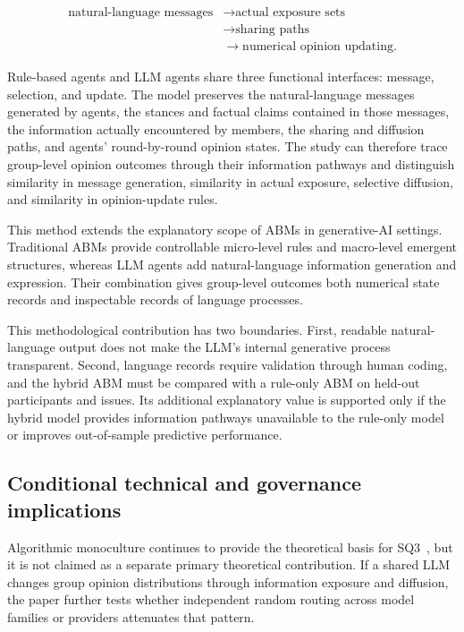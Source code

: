 \documentclass[11pt,a4paper]{article}
\begin{document}
\begin{equation*}
\begin{aligned}\text{natural-language messages} &\rightarrow \text{actual exposure sets} \\
&\rightarrow \text{sharing paths} \\
&\rightarrow \text{numerical opinion updating}.\end{aligned}
\end{equation*}

Rule-based agents and LLM agents share three functional interfaces: message, selection, and update. The model preserves the natural-language messages generated by agents, the stances and factual claims contained in those messages, the information actually encountered by members, the sharing and diffusion paths, and agents' round-by-round opinion states. The study can therefore trace group-level opinion outcomes through their information pathways and distinguish similarity in message generation, similarity in actual exposure, selective diffusion, and similarity in opinion-update rules.

This method extends the explanatory scope of ABMs in generative-AI settings. Traditional ABMs provide controllable micro-level rules and macro-level emergent structures, whereas LLM agents add natural-language information generation and expression. Their combination gives group-level outcomes both numerical state records and inspectable records of language processes.

This methodological contribution has two boundaries. First, readable natural-language output does not make the LLM's internal generative process transparent. Second, language records require validation through human coding, and the hybrid ABM must be compared with a rule-only ABM on held-out participants and issues. Its additional explanatory value is supported only if the hybrid model provides information pathways unavailable to the rule-only model or improves out-of-sample predictive performance.

\subsection{Conditional technical and governance implications}

Algorithmic monoculture continues to provide the theoretical basis for SQ3~\citep{kleinberg2021}, but it is not claimed as a separate primary theoretical contribution. If a shared LLM changes group opinion distributions through information exposure and diffusion, the paper further tests whether independent random routing across model families or providers attenuates that pattern.
\end{document}
